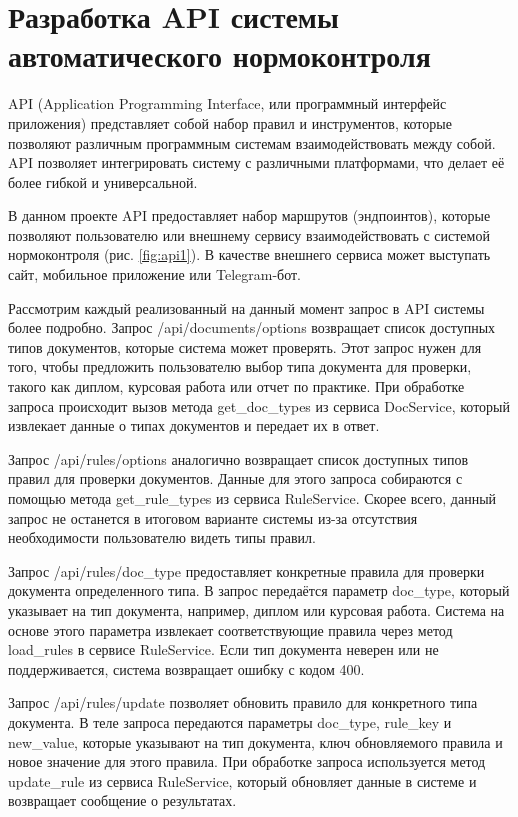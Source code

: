 \documentclass{report}
\begin{document}
\section{Разработка API системы автоматического нормоконтроля}

API (Application Programming Interface, или программный интерфейс приложения) представляет собой набор правил и инструментов, которые позволяют различным программным системам взаимодействовать между собой. API позволяет интегрировать систему с различными платформами, что делает её более гибкой и универсальной.

В данном проекте API предоставляет набор маршрутов (эндпоинтов), которые позволяют пользователю или внешнему сервису взаимодействовать с системой нормоконтроля (рис. \ref{fig:api1}). В качестве внешнего сервиса может выступать сайт, мобильное приложение или Telegram-бот.



Рассмотрим каждый реализованный на данный момент запрос в API системы более подробно. Запрос /api/documents/options возвращает список доступных типов документов, которые система может проверять. Этот запрос нужен для того, чтобы предложить пользователю выбор типа документа для проверки, такого как диплом, курсовая работа или отчет по практике. При обработке запроса происходит вызов метода get\_doc\_types из сервиса DocService, который извлекает данные о типах документов и передает их в ответ.

Запрос /api/rules/options аналогично возвращает список доступных типов правил для проверки документов. Данные для этого запроса собираются с помощью метода get\_rule\_types из сервиса RuleService. Скорее всего, данный запрос не останется в итоговом варианте системы из-за отсутствия необходимости пользователю видеть типы правил.

Запрос /api/rules/{doc\_type} предоставляет конкретные правила для проверки документа определенного типа. В запрос передаётся параметр doc\_type, который указывает на тип документа, например, диплом или курсовая работа. Система на основе этого параметра извлекает соответствующие правила через метод load\_rules в сервисе RuleService. Если тип документа неверен или не поддерживается, система возвращает ошибку с кодом 400.

Запрос /api/rules/update позволяет обновить правило для конкретного типа документа. В теле запроса передаются параметры doc\_type, rule\_key и new\_value, которые указывают на тип документа, ключ обновляемого правила и новое значение для этого правила. При обработке запроса используется метод update\_rule из сервиса RuleService, который обновляет данные в системе и возвращает сообщение о результатах.
\end{document}
